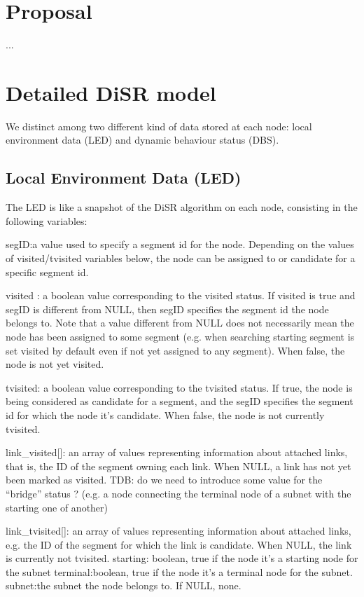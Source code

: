 \documentclass[conference]{IEEEtran}
\begin{document}
\section{Proposal}
...

\section{Detailed DiSR model}
We distinct among two different kind of data stored at each node:
local environment data (LED) and dynamic behaviour status (DBS).

\subsection{Local Environment Data (LED)}

The LED is like a snapshot of the DiSR algorithm on each node,
consisting in the following variables:

segID:a value used to specify a segment id for the node. Depending on
the values of visited/tvisited variables below, the node can be
assigned to or candidate for a specific segment id.  

visited : a boolean value corresponding to the visited status. If visited is true
and segID is different from NULL, then segID specifies the segment id
the node belongs to. Note that a value different from NULL does not
necessarily mean the node has been assigned to some segment (e.g. when
searching starting segment is set visited by default even if not yet
assigned to any segment). When false, the node is not yet visited.

tvisited: a boolean value corresponding to the tvisited status. If
true, the node is being considered as candidate for a segment, and the
segID specifies the segment id for which the node it's candidate. When
false, the node is not currently tvisited.  

link_visited[]: an array
of values representing information about attached links, that is, the
ID of the segment owning each link. When NULL, a link has not yet been
marked as visited. TDB: do we need to introduce some value for the
“bridge” status ? (e.g. a node connecting the terminal node of a
subnet with the starting one of another) 

link_tvisited[]: an array of
values representing information about attached links, e.g. the ID of
the segment for which the link is candidate. When NULL, the link is
currently not tvisited.  starting: boolean, true if the node it's a
starting node for the subnet terminal:boolean, true if the node it's a
terminal node for the subnet.  subnet:the subnet the node belongs to.
If NULL, none.
\end{document}
